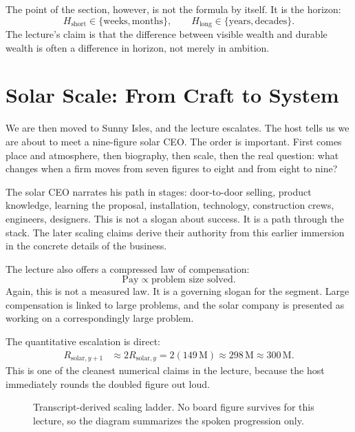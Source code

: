 The point of the section, however, is not the formula by itself. It is the horizon:
\begin{equation}
H_{\text{short}}\in\{\text{weeks},\text{months}\},
\qquad
H_{\text{long}}\in\{\text{years},\text{decades}\}.
\end{equation}
The lecture's claim is that the difference between visible wealth and durable wealth is often a difference in horizon, not merely in ambition.

\section{Solar Scale: From Craft to System}

We are then moved to Sunny Isles, and the lecture escalates. The host tells us we are about to meet a nine-figure solar CEO. The order is important. First comes place and atmosphere, then biography, then scale, then the real question: what changes when a firm moves from seven figures to eight and from eight to nine?

The solar CEO narrates his path in stages: door-to-door selling, product knowledge, learning the proposal, installation, technology, construction crews, engineers, designers. This is not a slogan about success. It is a path through the stack. The later scaling claims derive their authority from this earlier immersion in the concrete details of the business.

The lecture also offers a compressed law of compensation:
\begin{equation}
\text{Pay} \propto \text{problem size solved}.
\end{equation}
Again, this is not a measured law. It is a governing slogan for the segment. Large compensation is linked to large problems, and the solar company is presented as working on a correspondingly large problem.

The quantitative escalation is direct:
\begin{align}
R_{\text{solar},y+1}
&\approx 2R_{\text{solar},y}
=2(149\,\mathrm{M})
\approx 298\,\mathrm{M}
\approx 300\,\mathrm{M}.
\end{align}
This is one of the cleanest numerical claims in the lecture, because the host immediately rounds the doubled figure out loud.

\begin{figure}[h]
\centering
{}
\caption{Transcript-derived scaling ladder. No board figure survives for this lecture, so the diagram summarizes the spoken progression only.}
\end{figure}

